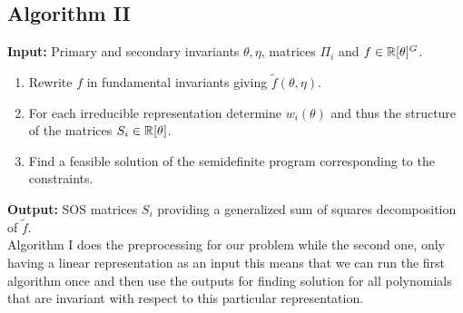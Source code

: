 \documentclass[]{article}
\begin{document}
\subsection*{Algorithm II}

\textbf{Input: } Primary and secondary invariants $\theta,\eta$, matrices $\Pi_i$ and $f \in \mathbb R[\theta]^G$.

\begin{enumerate}
    \item Rewrite $f$ in fundamental invariants giving $\tilde{f}(\theta,\eta)$.
    \item For each irreducible representation determine $w_i(\theta)$ and thus the structure of the matrices $S_i\in \mathbb R[\theta]$. %
    \item Find a feasible solution of the semidefinite program corresponding to the constraints.
\end{enumerate}
\noindent
\textbf{Output:} SOS matrices $S_i$ providing a generalized sum of squares decomposition of $\tilde{f}$.\\



Algorithm I does the preprocessing for our problem while the second one, only having a linear representation as an input
this means that we can run the first algorithm once and then 
use the outputs for finding solution for 
all polynomials that are invariant with respect to this particular representation.
\end{document}
